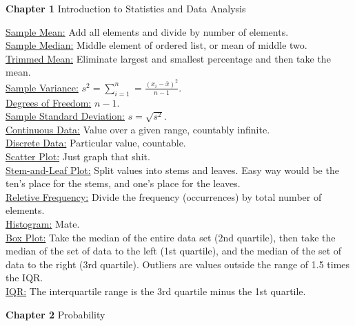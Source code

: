 \documentclass[9pt]{article}
\newcommand*\mean[1]{\bar{#1}}
\begin{document}
    \noindent\textbf{Chapter 1} Introduction to Statistics and Data Analysis
        \begin{multicols}{2}
            \noindent\underline{Sample Mean:} Add all elements and divide by number of elements.\\
            \underline{Sample Median:} Middle element of ordered list, or mean of middle two.\\
            \underline{Trimmed Mean:} Eliminate largest and smallest percentage and then take the mean.\\
            \underline{Sample Variance:} $s^2 = \sum_{i=1}^{n}=\frac{(x_i-\mean{x})^2}{n-1}$.\\
            \underline{Degrees of Freedom:} $n-1$.\\
            \underline{Sample Standard Deviation:} $s = \sqrt{s^2}$.\\
            \underline{Continuous Data:} Value over a given range, countably infinite.\\
            \underline{Discrete Data:} Particular value, countable.\\
            \underline{Scatter Plot:} Just graph that shit.\\
            \underline{Stem-and-Leaf Plot:} Split values into stems and leaves. Easy way would be the ten's place for the stems, and one's place for the leaves.\\
            \underline{Reletive Frequency:} Divide the frequency (occurrences) by total number of elements.\\
            \underline{Histogram:} Mate.\\
            \underline{Box Plot:} Take the median of the entire data set (2nd quartile), then take the median of the set of data to the left (1st quartile), and the median of the set of data to the right (3rd quartile). Outliers are values outside the range of 1.5 times the IQR.\\
            \underline{IQR:} The interquartile range is the 3rd quartile minus the 1st quartile.
        \end{multicols}
    \noindent\textbf{Chapter 2} Probability
\end{document}
